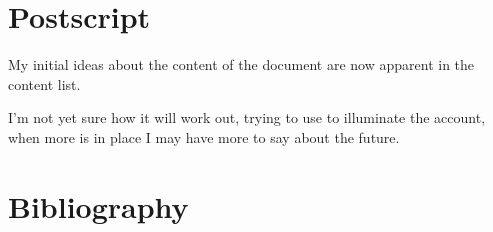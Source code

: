 
\section{Postscript}\label{POSTSCRIPT}

My initial ideas about the content of the document are now apparent in the content list.

I'm not yet sure how it will work out, trying to use {\Product} to illuminate the account, when more is in place I may have more to say about the future.

\appendix

\vfill

\ignore{


}%

\pagebreak

\section*{Bibliography}\label{BIBLIOGRAPHY}

{\def\section*#1{\ignore{#1}}
\raggedright


} %

{
{\small\printindex}}


